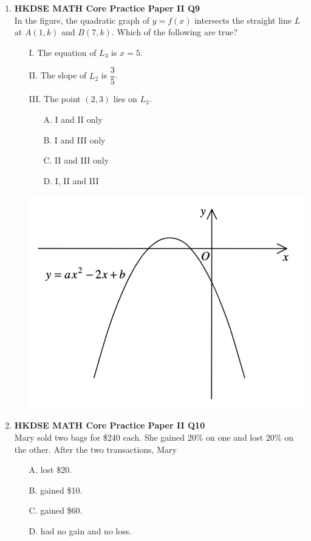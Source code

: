 \documentclass[12pt]{article}
\begin{document}
\begin{enumerate}
	\item \textbf{HKDSE MATH Core Practice Paper II Q9}\\
	In the figure, the quadratic graph of $y = f(x)$ intersects the straight line $L$ at $A(1 , k)$ and $B(7 , k)$. Which of the following are true?
	\begin{enumerate}
		\item[I.] The equation of $L_3$ is $x = 5$.
		\item[II.] The slope of $L_2$ is $\dfrac{3}{5}$.
		\item[III.] The point $(2,3)$ lies on $L_3$.
		\item[]
			\begin{minipage}[u]{.39\textwidth}
				\begin{enumerate}
					\item[A.] I and II only
					\item[B.] I and III only
					\item[C.] II and III only
					\item[D.] I, II and III
				\end{enumerate}
			\end{minipage}
			\begin{minipage}[u]{.5\textwidth}
				\centering
				\includegraphics[scale=0.6]{PPFigure2.8.png}
			\end{minipage}
	\end{enumerate}

	\item \textbf{HKDSE MATH Core Practice Paper II Q10}\\
	Mary sold two bags for \$240 each. She gained 20\% on one and lost 20\% on the other. After the two transactions, Mary
	\begin{enumerate}
		\item[A.] lost \$20.
		\item[B.] gained \$10.
		\item[C.] gained \$60.
		\item[D.] had no gain and no loss.
	\end{enumerate}


\end{enumerate}
\end{document}
